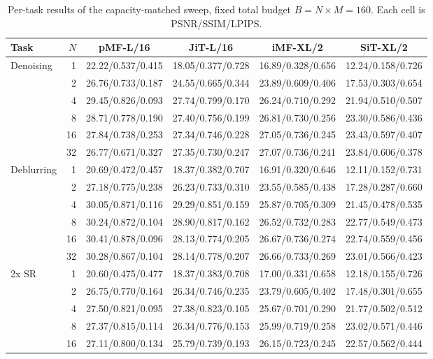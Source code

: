 \begin{table}[t]
\centering
\scriptsize
\setlength{\tabcolsep}{3pt}
\caption{Per-task results of the capacity-matched sweep, fixed total budget $B = N \times M = 160$. Each cell is PSNR/SSIM/LPIPS.}
\label{tab:capacity_fixedB_tasks}
\begin{tabular}{lrcccc}
\toprule
Task & $N$ & pMF-L/16 & JiT-L/16 & iMF-XL/2 & SiT-XL/2 \\
\midrule
Denoising & 1 & 22.22/0.537/0.415 & 18.05/0.377/0.728 & 16.89/0.328/0.656 & 12.24/0.158/0.726 \\
 & 2 & 26.76/0.733/0.187 & 24.55/0.665/0.344 & 23.89/0.609/0.406 & 17.53/0.303/0.654 \\
 & 4 & 29.45/0.826/0.093 & 27.74/0.799/0.170 & 26.24/0.710/0.292 & 21.94/0.510/0.507 \\
 & 8 & 28.71/0.778/0.190 & 27.40/0.756/0.199 & 26.81/0.730/0.256 & 23.30/0.586/0.436 \\
 & 16 & 27.84/0.738/0.253 & 27.34/0.746/0.228 & 27.05/0.736/0.245 & 23.43/0.597/0.407 \\
 & 32 & 26.77/0.671/0.327 & 27.35/0.730/0.247 & 27.07/0.736/0.241 & 23.84/0.606/0.378 \\
\midrule
Deblurring & 1 & 20.69/0.472/0.457 & 18.37/0.382/0.707 & 16.91/0.320/0.646 & 12.11/0.152/0.731 \\
 & 2 & 27.18/0.775/0.238 & 26.23/0.733/0.310 & 23.55/0.585/0.438 & 17.28/0.287/0.660 \\
 & 4 & 30.05/0.871/0.116 & 29.29/0.851/0.159 & 25.87/0.705/0.309 & 21.45/0.478/0.535 \\
 & 8 & 30.24/0.872/0.104 & 28.90/0.817/0.162 & 26.52/0.732/0.283 & 22.77/0.549/0.473 \\
 & 16 & 30.41/0.878/0.096 & 28.13/0.774/0.205 & 26.67/0.736/0.274 & 22.74/0.559/0.456 \\
 & 32 & 30.28/0.867/0.104 & 28.14/0.778/0.207 & 26.66/0.733/0.269 & 23.01/0.566/0.423 \\
\midrule
2x SR & 1 & 20.60/0.475/0.477 & 18.37/0.383/0.708 & 17.00/0.331/0.658 & 12.18/0.155/0.726 \\
 & 2 & 26.75/0.770/0.164 & 26.34/0.746/0.235 & 23.79/0.605/0.402 & 17.48/0.301/0.655 \\
 & 4 & 27.50/0.821/0.095 & 27.38/0.823/0.105 & 25.67/0.701/0.290 & 21.77/0.502/0.512 \\
 & 8 & 27.37/0.815/0.114 & 26.34/0.776/0.153 & 25.99/0.719/0.258 & 23.02/0.571/0.446 \\
 & 16 & 27.11/0.800/0.134 & 25.79/0.739/0.193 & 26.15/0.723/0.245 & 22.57/0.562/0.444 \\

\end{tabular}
\end{table}
